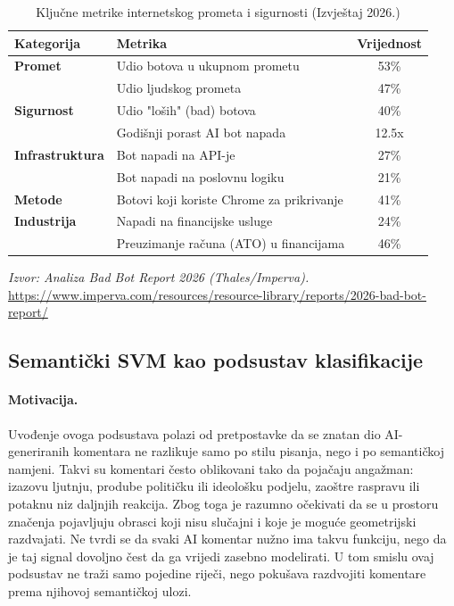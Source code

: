 \documentclass{article}
\begin{document}
\begin{table}[h!]
\centering
\caption{Ključne metrike internetskog prometa i sigurnosti (Izvještaj 2026.)}
\vspace{2mm}
\begin{tabular}{@{}llc@{}}
\toprule
\textbf{Kategorija} & \textbf{Metrika} & \textbf{Vrijednost} \\ \midrule
\textbf{Promet} & Udio botova u ukupnom prometu & 53\% \\
 & Udio ljudskog prometa & 47\% \\
\textbf{Sigurnost} & Udio "loših" (bad) botova & 40\% \\
 & Godišnji porast AI bot napada & 12.5x \\
\textbf{Infrastruktura} & Bot napadi na API-je & 27\% \\
 & Bot napadi na poslovnu logiku & 21\% \\
\textbf{Metode} & Botovi koji koriste Chrome za prikrivanje & 41\% \\
\textbf{Industrija} & Napadi na financijske usluge & 24\% \\
 & Preuzimanje računa (ATO) u financijama & 46\% \\ \bottomrule
\end{tabular}
\begin{flushleft}
\footnotesize \textit{Izvor: Analiza Bad Bot Report 2026 (Thales/Imperva).} \url{https://www.imperva.com/resources/resource-library/reports/2026-bad-bot-report/}
\end{flushleft}
\end{table}
\subsection{Semantički SVM kao podsustav klasifikacije}

\paragraph{Motivacija.}
Uvođenje ovoga podsustava polazi od pretpostavke da se znatan dio AI-generiranih komentara ne razlikuje samo po stilu pisanja, nego i po semantičkoj namjeni. Takvi su komentari često oblikovani tako da pojačaju angažman: izazovu ljutnju, prodube političku ili ideološku podjelu, zaoštre raspravu ili potaknu niz daljnjih reakcija. Zbog toga je razumno očekivati da se u prostoru značenja pojavljuju obrasci koji nisu slučajni i koje je moguće geometrijski razdvajati. Ne tvrdi se da svaki AI komentar nužno ima takvu funkciju, nego da je taj signal dovoljno čest da ga vrijedi zasebno modelirati. U tom smislu ovaj podsustav ne traži samo pojedine riječi, nego pokušava razdvojiti komentare prema njihovoj semantičkoj ulozi.
\end{document}
